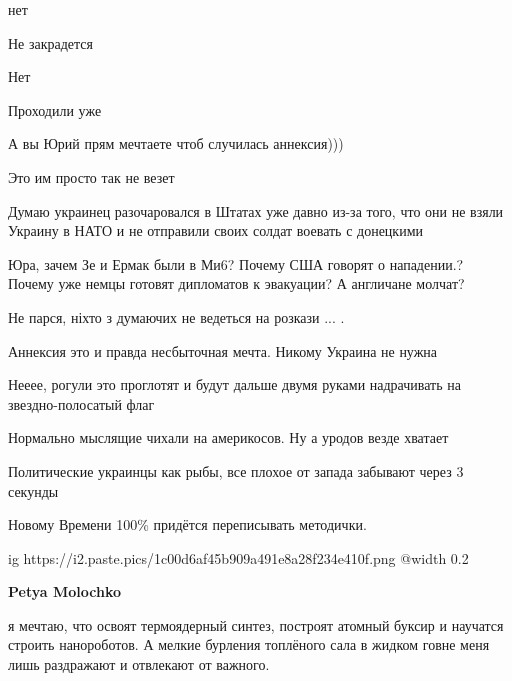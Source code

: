 \raggedcolumns
\begin{multicols}{2} %
\setlength{\parindent}{0pt}

нет

Не закрадется

Нет

Проходили уже

А вы Юрий прям мечтаете чтоб случилась аннексия)))

Это им просто так не везет


Думаю украинец разочаровался в Штатах уже давно из-за того, что они не взяли
Украину в НАТО и не отправили своих солдат воевать с донецкими


Юра, зачем Зе и Ермак были в Ми6? Почему США говорят о нападении.? Почему уже
немцы готовят дипломатов к эвакуации? А англичане молчат?


Не парся, ніхто з думаючих не ведеться на розкази ... .


Аннексия это и правда несбыточная мечта. Никому Украина не нужна


Нееее, рогули это проглотят и будут дальше двумя руками надрачивать на звездно-полосатый флаг


Нормально мыслящие чихали на  америкосов. Ну а уродов везде хватает


Политические украинцы как рыбы, все плохое от запада забывают через 3 секунды


Новому Времени 100\% придётся переписывать методички.

\ifcmt
  ig https://i2.paste.pics/1c00d6af45b909a491e8a28f234e410f.png
  @width 0.2
\fi

\textbf{Petya Molochko}

я мечтаю, что освоят термоядерный синтез, построят атомный буксир и научатся
строить нанороботов. А мелкие бурления топлёного сала в жидком говне меня лишь
раздражают и отвлекают от важного.



\end{multicols}
